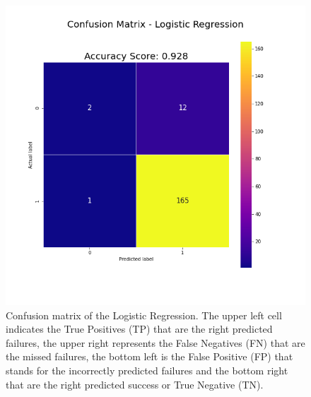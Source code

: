 \documentclass[english,notitlepage,reprint,nofootinbib]{revtex4-1}  %
\begin{document}
\begin{figure}[h]
    \centering 
    \includegraphics[scale=0.3]{results/confusionmatrix_logreg.png}
    \caption{Confusion matrix of the Logistic Regression. The upper left cell indicates the True Positives (TP) that are the right predicted failures, the upper right represents the False Negatives (FN) that are the missed failures, the bottom left is the False Positive (FP) that stands for the incorrectly predicted failures and the bottom right that are the right predicted success or True Negative (TN).}
    \label{res:cm_log}
\end{figure}
\end{document}
